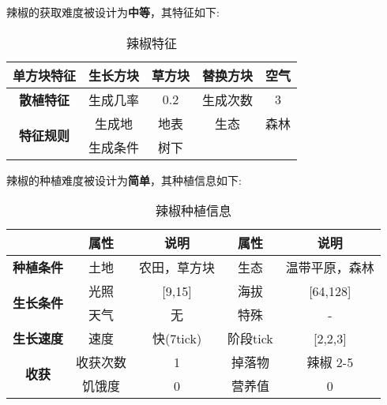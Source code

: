 辣椒的获取难度被设计为\textbf{中等}，其特征如下:
\begin{table}[H]
    \centering
    \caption{辣椒特征}
    \label{table:辣椒特征}
    \setlength{\tabcolsep}{4mm}
    \begin{tabular}{c|cc|cc}
        \toprule
        \textbf{单方块特征} & 生长方块 & 草方块 & 替换方块 & 空气 \\
        \midrule
        \textbf{散植特征} & 生成几率 & 0.2 & 生成次数 & 3 \\
        \midrule
        \multirow{2}{*}{\textbf{特征规则}} & 生成地 & 地表 & 生态 & 森林 \\
                        & 生成条件 & 树下  \\
        \bottomrule
    \end{tabular}
\end{table}


辣椒的种植难度被设计为\textbf{简单}，其种植信息如下:

\begin{table}[H]
    \centering
    \caption{辣椒种植信息}
    \label{table:辣椒种植信息}
    \setlength{\tabcolsep}{4mm}
    \begin{tabular}{c|cc|cc}
        \toprule
                                           & \textbf{属性} & \textbf{说明} & \textbf{属性} & \textbf{说明}        \\
        \midrule
        \textbf{种植条件}                  & 土地          & 农田，草方块    & 生态          & 温带平原，森林 \\
        \midrule
        \multirow{2}{*}{\textbf{生长条件}} & 光照          & [9,15]        & 海拔          & [64,128]               \\
                                           & 天气          & 无            & 特殊          & -             \\
        \midrule
        \textbf{生长速度}                  & 速度          & 快(7tick)    & 阶段tick      & [2,2,3]              \\
        \midrule
        \multirow{2}{*}{\textbf{收获}}     & 收获次数      & 1             & 掉落物        & 辣椒 2-5     \\
                                           & 饥饿度        & 0             & 营养值        & 0                    \\
        \bottomrule
    \end{tabular}
\end{table}

\newpage